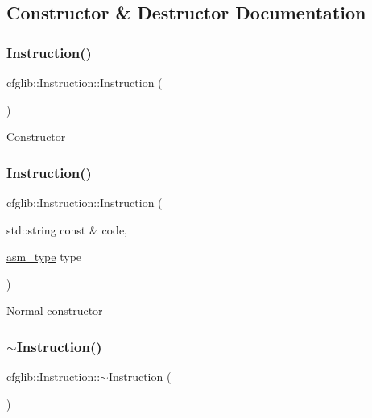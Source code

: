 \subsection{Constructor \& Destructor Documentation}
\mbox{\label{classcfglib_1_1Instruction_afbca05ecb59e5a9b0b0027aadab48738}} 
\subsubsection{\texorpdfstring{Instruction()}{Instruction()}\hspace{0.1cm}{\footnotesize\ttfamily [1/2]}}
{\footnotesize\ttfamily cfglib\+::\+Instruction\+::\+Instruction (\begin{DoxyParamCaption}{ }\end{DoxyParamCaption})}

Constructor \mbox{\label{classcfglib_1_1Instruction_a22e42389cb62f96a0b28e3f7ebd1b323}} 
\subsubsection{\texorpdfstring{Instruction()}{Instruction()}\hspace{0.1cm}{\footnotesize\ttfamily [2/2]}}
{\footnotesize\ttfamily cfglib\+::\+Instruction\+::\+Instruction (\begin{DoxyParamCaption}\item[{std\+::string const \&}]{code,  }\item[{\hyperlink{namespacecfglib_a5ae32d51cf4ff1db5485367eab63a500}{asm\+\_\+type}}]{type }\end{DoxyParamCaption})}

Normal constructor \mbox{\label{classcfglib_1_1Instruction_aea2b37b89a6d029c20d0a49f1c89db66}} 
\subsubsection{\texorpdfstring{$\sim$\+Instruction()}{~Instruction()}}
{\footnotesize\ttfamily cfglib\+::\+Instruction\+::$\sim$\+Instruction (\begin{DoxyParamCaption}{ }\end{DoxyParamCaption})}

